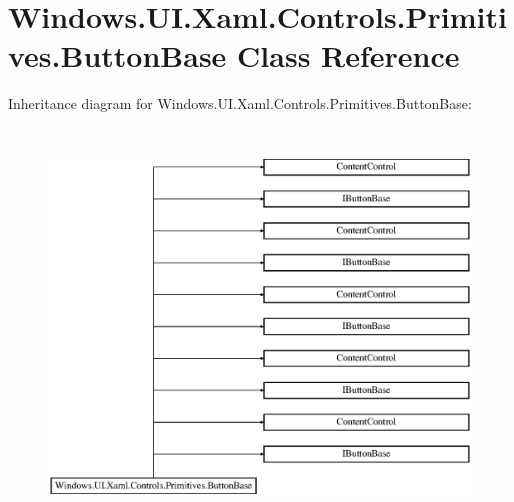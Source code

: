 \hypertarget{class_windows_1_1_u_i_1_1_xaml_1_1_controls_1_1_primitives_1_1_button_base}{}\section{Windows.\+U\+I.\+Xaml.\+Controls.\+Primitives.\+Button\+Base Class Reference}
\label{class_windows_1_1_u_i_1_1_xaml_1_1_controls_1_1_primitives_1_1_button_base}
Inheritance diagram for Windows.\+U\+I.\+Xaml.\+Controls.\+Primitives.\+Button\+Base\+:\begin{figure}[H]
\begin{center}
\leavevmode
\includegraphics[height=10.511946cm]{class_windows_1_1_u_i_1_1_xaml_1_1_controls_1_1_primitives_1_1_button_base}
\end{center}
\end{figure}
